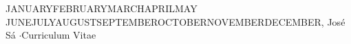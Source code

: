\documentclass[11pt, a4paper]{awesome-cv}
\newcommand{\dotsep}{\enskip$\cdot$\enskip}
\begin{document}
\makecvheader

\renewcommand{\today}{
\ifcase \month \or JANUARY\or FEBRUARY\or MARCH\or APRIL\or MAY
\or JUNE\or JULY\or AUGUST\or SEPTEMBER\or OCTOBER\or NOVEMBER\or DECEMBER\fi \space \number\day,
\space\number\year} 

\makecvfooter
{\today}
{José Sá \dotsep Curriculum Vitae}
{\small\thepage}




%



%

%
%
%


\end{document}
